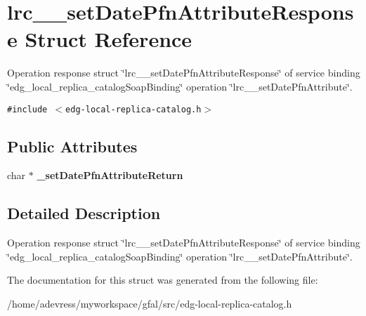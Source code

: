 \section{lrc\_\-\_\-set\-Date\-Pfn\-Attribute\-Response Struct Reference}
\label{structlrc____setDatePfnAttributeResponse}
Operation response struct \char`\"{}lrc\_\-\_\-set\-Date\-Pfn\-Attribute\-Response\char`\"{} of service binding \char`\"{}edg\_\-local\_\-replica\_\-catalog\-Soap\-Binding\char`\"{} operation \char`\"{}lrc\_\-\_\-set\-Date\-Pfn\-Attribute\char`\"{}.  


{\tt \#include $<$edg-local-replica-catalog.h$>$}

\subsection*{Public Attributes}
\begin{CompactItemize}
\item 
char $\ast$ \textbf{\_\-set\-Date\-Pfn\-Attribute\-Return}\label{structlrc____setDatePfnAttributeResponse_d5c3fc9187ad8a53a7575b102bde1c6c}

\end{CompactItemize}


\subsection{Detailed Description}
Operation response struct \char`\"{}lrc\_\-\_\-set\-Date\-Pfn\-Attribute\-Response\char`\"{} of service binding \char`\"{}edg\_\-local\_\-replica\_\-catalog\-Soap\-Binding\char`\"{} operation \char`\"{}lrc\_\-\_\-set\-Date\-Pfn\-Attribute\char`\"{}. 



The documentation for this struct was generated from the following file:\begin{CompactItemize}
\item 
/home/adevress/myworkspace/gfal/src/edg-local-replica-catalog.h\end{CompactItemize}

